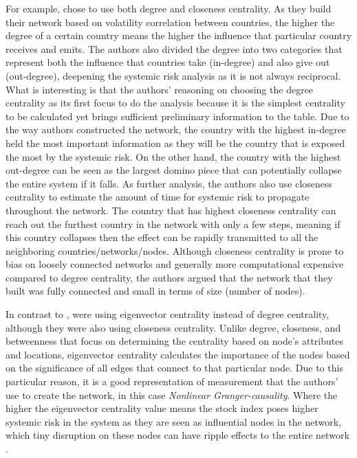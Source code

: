 \documentclass[a4paper,11pt]{article}
\begin{document}
For example, \cite{Lai_Hu_2021} chose to use both degree and closeness centrality. As they build their network based on volatility correlation between countries, the higher the degree of a certain country means the higher the influence that particular country receives and emits. The authors also divided the degree into two categories that represent both the influence that countries take (in-degree) and also give out (out-degree), deepening the systemic risk analysis as it is not always reciprocal. What is interesting is that the authors’ reasoning on choosing the degree centrality as its first focus to do the analysis because it is the simplest centrality to be calculated yet brings sufficient preliminary information to the table. Due to the way authors constructed the network, the country with the highest in-degree held the most important information as they will be the country that is exposed the most by the systemic risk. On the other hand, the country with the highest out-degree can be seen as the largest domino piece that can potentially collapse the entire system if it falls. As further analysis, the authors also use closeness centrality to estimate the amount of time for systemic risk to propagate throughout the network. The country that has highest closeness centrality can reach out the furthest country in the network with only a few steps, meaning if this country collapses then the effect can be rapidly transmitted to all the neighboring countries/networks/nodes. Although closeness centrality is prone to bias on loosely connected networks and generally more computational expensive compared to degree centrality, the authors argued that the network that they built was fully connected and small in terms of size (number of nodes). 

In contrast to \cite{Lai_Hu_2021}, \cite{Zhang_Yin_Sha_2023} were using eigenvector centrality instead of degree centrality, although they were also using closeness centrality. Unlike degree, closeness, and betweenness that focus on determining the centrality based on node’s attributes and locations, eigenvector centrality calculates the importance of the nodes based on the significance of all edges that connect to that particular node. Due to this particular reason, it is a good representation of measurement that the authors’ use to create the network, in this case \textit{Nonlinear Granger-causality}. Where the higher the eigenvector centrality value means the stock index poses higher systemic risk in the system as they are seen as influential nodes in the network, which tiny disruption on these nodes can have ripple effects to the entire network \cite{Zhang_Yin_Sha_2023}. 
\end{document}
